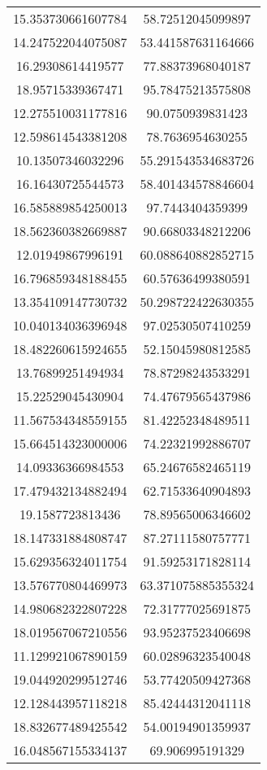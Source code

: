 \begin{table}
\begin{tabular}{cc}
15.353730661607784 & 58.72512045099897 \\
14.247522044075087 & 53.441587631164666 \\
16.29308614419577 & 77.88373968040187 \\
18.95715339367471 & 95.78475213575808 \\
12.275510031177816 & 90.0750939831423 \\
12.598614543381208 & 78.7636954630255 \\
10.13507346032296 & 55.291543534683726 \\
16.16430725544573 & 58.401434578846604 \\
16.585889854250013 & 97.7443404359399 \\
18.562360382669887 & 90.66803348212206 \\
12.01949867996191 & 60.088640882852715 \\
16.796859348188455 & 60.57636499380591 \\
13.354109147730732 & 50.298722422630355 \\
10.040134036396948 & 97.02530507410259 \\
18.482260615924655 & 52.15045980812585 \\
13.76899251494934 & 78.87298243533291 \\
15.22529045430904 & 74.47679565437986 \\
11.567534348559155 & 81.42252348489511 \\
15.664514323000006 & 74.22321992886707 \\
14.09336366984553 & 65.24676582465119 \\
17.479432134882494 & 62.71533640904893 \\
19.1587723813436 & 78.89565006346602 \\
18.147331884808747 & 87.27111580757771 \\
15.629356324011754 & 91.59253171828114 \\
13.576770804469973 & 63.371075885355324 \\
14.980682322807228 & 72.31777025691875 \\
18.019567067210556 & 93.95237523406698 \\
11.129921067890159 & 60.02896323540048 \\
19.044920299512746 & 53.77420509427368 \\
12.128443957118218 & 85.42444312041118 \\
18.832677489425542 & 54.00194901359937 \\
16.048567155334137 & 69.906995191329 \\

\end{tabular}
\end{table}
